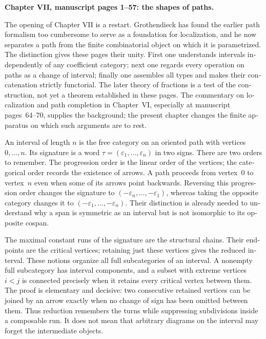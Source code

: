 \begin{otherlanguage}{english}
\noindent\textbf{Chapter VII, manuscript pages 1--57: the shapes of paths.}

The opening of Chapter VII is a restart. Grothendieck has found the earlier path formalism too cumbersome to serve as a foundation for localization, and he now separates a path from the finite combinatorial object on which it is parametrized. The distinction gives these pages their unity. First one understands intervals independently of any coefficient category; next one regards every operation on paths as a change of interval; finally one assembles all types and makes their concatenation strictly functorial. The later theory of fractions is a test of the construction, not yet a theorem established in these pages. The commentary on localization and path completion in Chapter~VI, especially at manuscript pages~64--70, supplies the background; the present chapter changes the finite apparatus on which such arguments are to rest.

An interval of length $n$ is the free category on an oriented path with vertices $0,\ldots,n$. Its signature is a word $\tau=(\varepsilon_1,\ldots,\varepsilon_n)$ in two signs. There are two orders to remember. The progression order is the linear order of the vertices; the categorical order records the existence of arrows. A path proceeds from vertex~$0$ to vertex~$n$ even when some of its arrows point backwards. Reversing this progression order changes the signature to $(-\varepsilon_n,\ldots,-\varepsilon_1)$, whereas taking the opposite category changes it to $(-\varepsilon_1,\ldots,-\varepsilon_n)$. Their distinction is already needed to understand why a span is symmetric as an interval but is not isomorphic to its opposite cospan.

The maximal constant runs of the signature are the structural chains. Their endpoints are the critical vertices; retaining just these vertices gives the reduced interval. These notions organize all full subcategories of an interval. A nonempty full subcategory has interval components, and a subset with extreme vertices $i<j$ is connected precisely when it retains every critical vertex between them. The proof is elementary and decisive: two consecutive retained vertices can be joined by an arrow exactly when no change of sign has been omitted between them. Thus reduction remembers the turns while suppressing subdivisions inside a composable run. It does not mean that arbitrary diagrams on the interval may forget the intermediate objects.


\end{otherlanguage}
